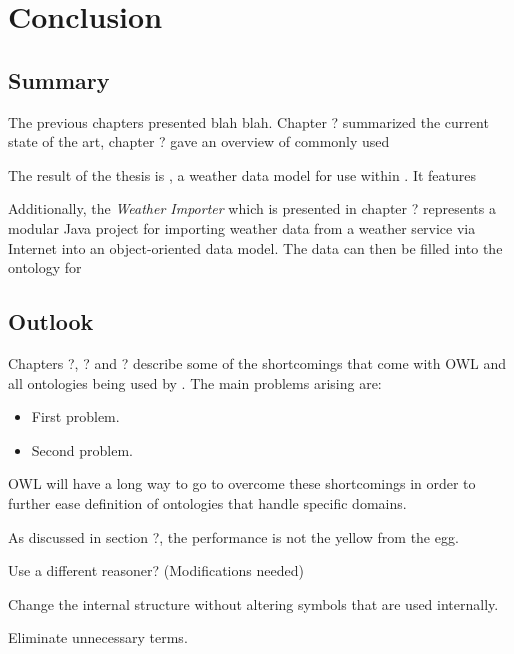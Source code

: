 \chapter{Conclusion}
\label{ch:conclusion}



\section{Summary}


The previous chapters presented blah blah. Chapter ? summarized the current state of the art, chapter ? gave an overview of commonly used 

The result of the thesis is \thinkhomeweather, a weather data model for use within \thinkhome. It features  %

Additionally, the \emph{Weather Importer} which is presented in chapter ? represents a modular Java project for importing weather data from a weather service via Internet into an object-oriented data model. The data can then be filled into the \thinkhomeweather ontology for %


\section{Outlook}

Chapters ?, ? and ? describe some of the shortcomings that come with OWL and all ontologies being used by \thinkhomeweather. The main problems arising are:

\begin{itemize}
  \item First problem.
  \item Second problem.
\end{itemize}

OWL will have a long way to go to overcome these shortcomings in order to further ease definition of ontologies that handle specific domains.


As discussed in section ?, the performance is not the yellow from the egg.

Use a different reasoner? (Modifications needed)

Change the internal structure without altering symbols that are used internally.

Eliminate unnecessary terms.

